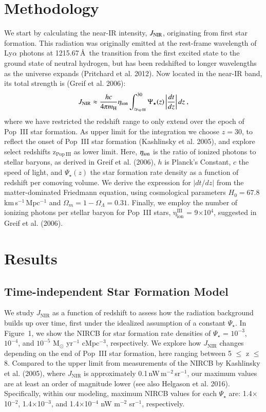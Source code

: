 \documentclass[11pt,twoside]{article}
\begin{document}
\section{Methodology}
We start by calculating the near-IR intensity, $J_{\rm NIR}$, originating from first star formation. This radiation was originally emitted at the rest-frame wavelength of Ly$\alpha$ photons at 1215.67\,\AA \, the transition from the first excited state to the ground state of neutral hydrogen, but has been redshifted to longer wavelengths as the universe expands (Pritchard et al. 2012). Now located in the near-IR band, its total strength is (Greif et al. 2006):
\begin{equation}
J_\mathrm{NIR} \approx \frac{hc}{4\pi m_{\rm H}} \eta_{\rm ion} \int_{z_\mathrm{Pop\,III}}^{30}   \Psi_{\star}(z) \left|\frac{dt}{dz}\right| dz
\mbox{\ ,}
\end{equation}
where we have restricted the redshift range to only extend over the epoch of Pop~III star formation. As upper limit for the integration we choose $z=30$, to reflect the onset of Pop~III star formation (Kashlinsky et al. 2005), and explore select redshifts z$_\mathrm{Pop\,III}$ as lower limit. Here, $\mathrm{\eta_{\rm ion}}$ is the ratio of ionized photons to stellar baryons, as derived in 
Greif et al. (2006), $h$ is Planck's Constant, $c$ the speed of light, and $\Psi_{\star}(z)$ the star formation rate density as a function of redshift per comoving volume. We derive the expression for $|dt/dz|$ from the matter-dominated Friedmann equation, using cosmological parameters $H_0=67.8$\,km\,s$^{-1}$\,Mpc$^{-1}$ and $\Omega_{m} = 1 - \Omega_{\Lambda} = 0.31$. Finally, we employ the number of ionizing photons per stellar baryon for Pop~III stars, $\mathrm{\eta_{ion}^{III}}$ = 9$\times$10$^{4}$, suggested in Greif et al. (2006). 

\section{Results}
\subsection{Time-independent Star Formation Model}
We study $J_\mathrm{NIR}$ as a function of redshift to assess how the radiation background builds up over time, first under the idealized assumption of a constant $\Psi_{\star}$. In Figure~1, we show the NIRCB for star formation rate densities of $\Psi_{\star}$ = $10^{-3}$, $10^{-4}$, and $10^{-5}$ M$\mathrm{_{\odot}}$ yr$^{-1}$ cMpc$^{-3}$, respectively. 
We explore how $J_\mathrm{NIR}$ changes depending on the end of Pop~III star formation, here ranging between
5 $\leq$ z $\leq$ 8. Compared to the upper limit from measurements of the NIRCB by Kashlinsky et al. (2005), where $J_\mathrm{NIR}$ is approximately 0.1\,nW\,m$^{-2}$\,sr$^{-1}$, our maximum values are at least an order of magnitude lower (see also Helgason et al. 2016). Specifically, within our modeling, maximum NIRCB values for each $\Psi_{\star}$ are: 1.4$\times$10$^{-2}$, 1.4$\times$10$^{-3}$, and 1.4$\times$10$^{-4}$ nW 
m$^{-2}$ sr$^{-1}$, respectively.
\end{document}
